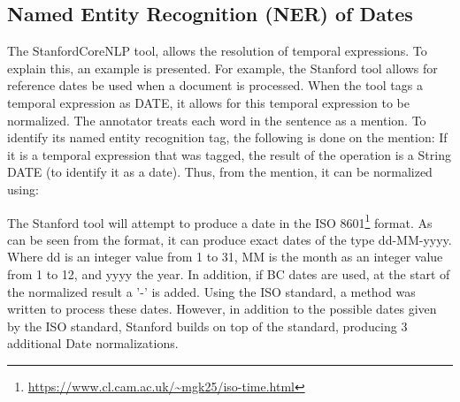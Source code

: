 \subsection{Named Entity Recognition (NER) of Dates}
\par The StanfordCoreNLP tool, allows the resolution of temporal expressions. To explain this, an example is presented. For example, the Stanford tool allows for reference dates be used when a document is processed. When the tool tags a temporal expression as DATE, it allows for this temporal expression to be normalized. The annotator treats each word in the sentence as a mention. To identify its named entity recognition tag, the following is done on the mention: 
If it is a temporal expression that was tagged, the result of the operation is a String DATE (to identify it as a date). Thus, from the mention, it can be normalized using: \par
{}
The Stanford tool will attempt to produce a date in the ISO 8601\footnote{\url{https://www.cl.cam.ac.uk/~mgk25/iso-time.html}} format. As can be seen from the format, it can produce exact dates of the type dd-MM-yyyy. Where dd is an integer value from 1 to 31, MM is the month as an integer value from 1 to 12, and yyyy the year. In addition, if BC dates are used, at the start of the normalized result a '-' is added. Using the ISO standard, a method was written to process these dates. However, in addition to the possible dates given by the ISO standard, Stanford builds on top of the standard, producing 3 additional Date normalizations.

